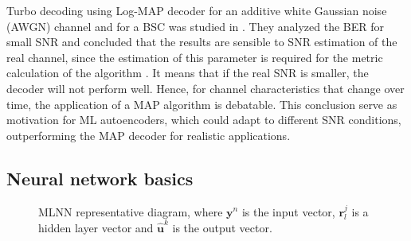 \documentclass[conference]{IEEEtran}
\begin{document}
Turbo decoding using Log-MAP decoder for an additive white Gaussian noise (AWGN) channel and for a BSC was studied in \cite{b5}. They analyzed the BER for small SNR and concluded that the results are sensible to SNR estimation of the real channel, since the estimation of this parameter is required for the metric calculation of the algorithm \cite{b6}. It means that if the real SNR is smaller, the decoder will not perform well. Hence, for channel characteristics that change over time, the application of a MAP algorithm is debatable. This conclusion serve as motivation for ML autoencoders, which could adapt to different SNR conditions, outperforming the MAP decoder for realistic applications.

\subsection{Neural network basics}


\begin{figure}[!hbp]
\centering


\caption{MLNN representative diagram, where $\textbf{y}^n$ is the input vector, $\textbf{r}_{l}^{j}$ is a hidden layer vector
and $\hat{\textbf{u}}^{k}$ is the output vector.} \label{fig:NN}
\end{figure}
\end{document}
